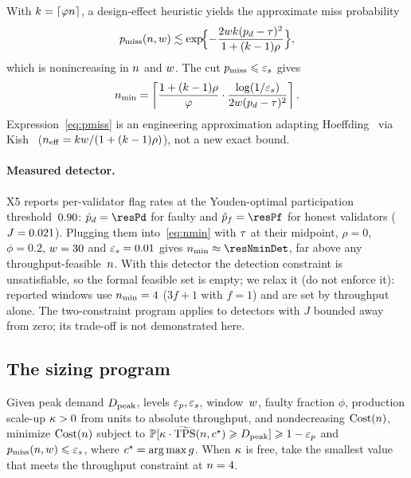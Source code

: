 With $k=\lceil\varphi n\rceil$, a design-effect heuristic yields the approximate
miss probability\label{st:rho}
\begin{equation}
\pmiss(\n,\w)\lesssim\exp\!\Bigl\{-\frac{2\w\kf(\pd-\thr)^{2}}{1+(\kf-1)\rho}\Bigr\},
\label{eq:pmiss}
\end{equation}
which is nonincreasing in $n$ and $w$. The cut $p_{\mathrm{miss}}\leqslant\varepsilon_{s}$ gives
\begin{equation}
\nmin=\left\lceil
\frac{1+(\kf-1)\rho}{\phi}\cdot
\frac{\log(1/\epss)}{2\w(\pd-\thr)^{2}}\right\rceil .
\label{eq:nmin}
\end{equation}
Expression~\eqref{eq:pmiss} is an engineering approximation adapting
Hoeffding~\cite{hoeffding1963} via Kish~\cite{kish1965}
($n_{\mathrm{eff}}=kw/(1+(k-1)\rho)$), not a new exact bound.

\paragraph{Measured detector.}
X5 reports per-validator flag rates at the Youden-optimal participation
threshold~$0.90$: $\hat p_{d}=\resPd$ for faulty and $\hat p_{f}=\resPf$ for
honest validators ($J=0.021$). Plugging them into~\eqref{eq:nmin} with
$\tau$ at their midpoint, $\rho=0$, $\phi=0.2$, $w=30$ and $\varepsilon_{s}=0.01$ gives
$\nmin\approx\resNminDet$, far above any throughput-feasible~$n$. With this
detector the detection constraint is unsatisfiable, so the formal feasible set
is empty; we relax it (do not enforce it): reported windows use $\nmin=\resNminCase$
($3f+1$ with $f=1$) and are set by throughput alone. The two-constraint program
applies to detectors with $J$ bounded away from zero; its trade-off is not
demonstrated here.

\subsection{The sizing program}

\begin{Problem}
\label{prob:sizing}
Given peak demand $D_{\mathrm{peak}}$, levels $\varepsilon_{p},\varepsilon_{s}$, window~$w$, faulty fraction
$\phi$, production scale-up $\kappa>0$ from \RNM{} units to absolute
throughput, and nondecreasing $\mathrm{Cost}(n)$, minimize $\mathrm{Cost}(n)$ subject to
$\mathbb{P}[\kappa\cdot\widetilde{\mathrm{TPS}}(n,c^{\star})\geqslant D_{\mathrm{peak}}]\geqslant1-\varepsilon_{p}$ and
$p_{\mathrm{miss}}(n,w)\leqslant\varepsilon_{s}$, where $\cc^{\star}=\arg\max\gfun$. When $\kappa$
is free, take the smallest value that meets the throughput constraint at
$n=4$.
\end{Problem}

